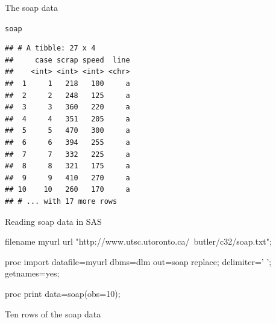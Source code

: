 \documentclass[unknownkeysallowed]{beamer}\usepackage[]{graphicx}\usepackage[]{color}
\makeatletter
\newcommand{\hlstd}[1]{\textcolor[rgb]{0.345,0.345,0.345}{#1}}%
\newenvironment{kframe}{%
 \def\at@end@of@kframe{}%
 \ifinner\ifhmode%
  \def\at@end@of@kframe{\end{minipage}}%
  \begin{minipage}{\columnwidth}%
 \fi\fi%
 \def\FrameCommand##1{\hskip\@totalleftmargin \hskip-\fboxsep
 \colorbox{shadecolor}{##1}\hskip-\fboxsep
     \hskip-\linewidth \hskip-\@totalleftmargin \hskip\columnwidth}%
 \MakeFramed {\advance\hsize-\width
   \@totalleftmargin\z@ \linewidth\hsize
   \@setminipage}}%
 {\par\unskip\endMakeFramed%
 \at@end@of@kframe}
\newenvironment{knitrout}{}{} %
\makeatother
\begin{document}
\begin{frame}[fragile]{The soap data}
  
\begin{knitrout}
\color{fgcolor}\begin{kframe}
\begin{alltt}
\hlstd{soap}
\end{alltt}
\begin{verbatim}
## # A tibble: 27 x 4
##     case scrap speed  line
##    <int> <int> <int> <chr>
##  1     1   218   100     a
##  2     2   248   125     a
##  3     3   360   220     a
##  4     4   351   205     a
##  5     5   470   300     a
##  6     6   394   255     a
##  7     7   332   225     a
##  8     8   321   175     a
##  9     9   410   270     a
## 10    10   260   170     a
## # ... with 17 more rows
\end{verbatim}
\end{kframe}
\end{knitrout}
  
\end{frame}

\begin{frame}[fragile]{Reading soap data in SAS}
  
  \begin{Sascode}[store=ub]
filename myurl 
 url "http://www.utsc.utoronto.ca/~butler/c32/soap.txt";

proc import 
  datafile=myurl 
  dbms=dlm
  out=soap
  replace;
  delimiter=' ';
  getnames=yes;
  
proc print data=soap(obs=10);

  \end{Sascode}
  
\end{frame}

\begin{frame}[fragile]{Ten rows of the soap data}
  
  
\end{frame}
\end{document}
